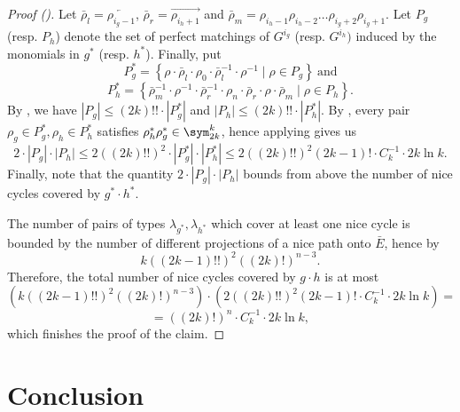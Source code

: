 \begin{proof}[Proof ()]
    Let $\bar\rho_l = \overleftarrow{\rho_{i_g - 1}}$, $\bar\rho_r = \overrightarrow{\rho_{i_h+1}}$ and $\bar\rho_m = \rho_{i_h - 1}\rho_{i_h - 2}\dots\rho_{i_g + 2}\rho_{i_g + 1}$. Let $P_g$ (resp. $P_h$) denote the set of perfect matchings of $G^{i_g}$ (resp. $G^{i_h})$ induced by the monomials in $g^*$ (resp. $h^*$). Finally, put
    $$
        P_g^* = \left\{
            \rho \cdot
            \bar\rho_l \cdot 
            \rho_0 \cdot 
            \bar\rho_l^{-1} \cdot 
            \rho^{-1}
            \mid \rho \in P_g
        \right\} \ \text{and}
    $$
    $$
        P_h^* = \left\{
            \bar\rho_m^{-1} \cdot
            \rho^{-1} \cdot
            \bar\rho_r^{-1} \cdot 
            \rho_n \cdot 
            \bar\rho_r \cdot 
            \rho \cdot
            \bar\rho_m
            \mid \rho \in P_h
        \right\}.
    $$
    By , we have $|P_g| \leq (2k)!! \cdot |P_g^*|$ and $|P_h| \leq (2k)!! \cdot |P_h^*|$.
    By , every pair $\rho_g \in P_g^*, \rho_h \in P_h^*$ satisfies $\rho_h^* \rho_g^* \in \sym_{2k}^k$, hence applying  gives us
    $$
        2 \cdot |P_g| \cdot |P_h| \leq
        2 ((2k)!!)^2 \cdot |P_g^*| \cdot |P_h^*| \leq
        2 ((2k)!!)^2 (2k - 1)! \cdot C_k^{-1} \cdot 2k \ln k.
    $$
    Finally, note that the quantity $2 \cdot |P_g| \cdot |P_h|$ bounds from above the number of nice cycles covered by $g^* \cdot h^*$.

    The number of pairs of types $\lambda_{g^*}, \lambda_{h^*}$ which cover at least one nice cycle is bounded by the number of different projections of a nice path onto $\bar{E}$, hence by
    $$
    k ((2k - 1)!!)^2 ((2k)!)^{n - 3}.
    $$
    Therefore, the total number of nice cycles covered by $g \cdot h$ is at most
    $$
    \left( k ((2k - 1)!!)^2 ((2k)!)^{n - 3} \right) \cdot
    \left( 2 ((2k)!!)^2 (2k - 1)! \cdot C_k^{-1} \cdot 2k \ln k \right) =
    $$
    $$
    = ((2k)!)^n \cdot C_k^{-1} \cdot 2k \ln k,
    $$
    which finishes the proof of the claim.

\end{proof}



\section{Conclusion}
\label{sec:con}

